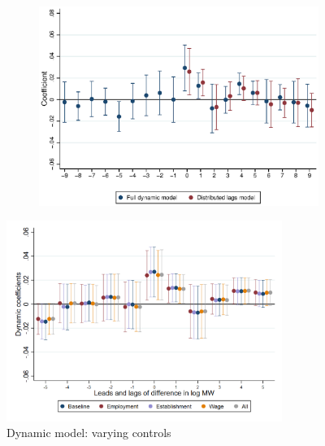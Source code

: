\documentclass{article}
\begin{document}
\begin{figure}[htb!]
\begin{subfigure}[b]{0.5\textwidth}
		\includegraphics[width = \textwidth]
		{../../analysis/first_differences/output/fd_models_coeffs_w9.eps}
	\end{subfigure}
\end{figure}

\begin{figure} \centering
	\caption{Dynamic model: varying controls}
	\includegraphics[width = 0.8\textwidth]{../../analysis/first_differences/output/fd_models_control.png}
\end{figure}
   
\end{document}
